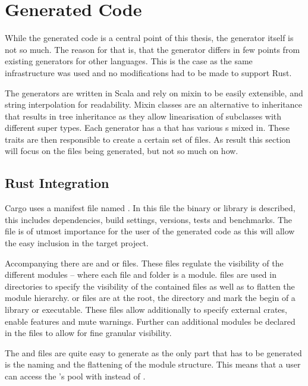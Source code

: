 \documentclass[thesis]{subfiles}
\begin{document}
\section{Generated Code}
  While the generated code is a central point of this thesis, the generator itself is not so much.
  The reason for that is, that the generator differs in few points from existing generators for other languages.
  This is the case as the same infrastructure was used and no modifications had to be made to support Rust.

  The generators are written in Scala and rely on mixin to be easily extensible, and string interpolation for readability.
  Mixin classes are an alternative to inheritance that results in tree inheritance as they allow linearisation of subclasses with different super types.\autocite{oop-inter}
  Each generator has a   that has various s mixed in.
  These traits are then responsible to create a certain set of files.
  As result this section will focus on the files being generated, but not so much on how.

  \subsection{Rust Integration}
    Cargo uses a manifest file named .
    In this file the binary or library is described, this includes dependencies, build settings, versions, tests and benchmarks.
    The file is of utmost importance for the user of the generated code as this will allow the easy inclusion in the target project.

    Accompanying there are  and  or  files.
    These files regulate the visibility of the different modules -- where each file and folder is a module.
     files are used in directories to specify the visibility of the contained files as well as to flatten the module hierarchy.
     or  files are at the root, the  directory and mark the begin of a library or executable.
    These files allow additionally to specify external crates, enable features and mute warnings.
    Further can additional modules be declared in the files to allow for fine granular visibility.

    The  and  files are quite easy to generate as the only part that has to be generated is the naming and the flattening of the module structure.
    This means that a user can access the 's pool with  instead of .
\end{document}
